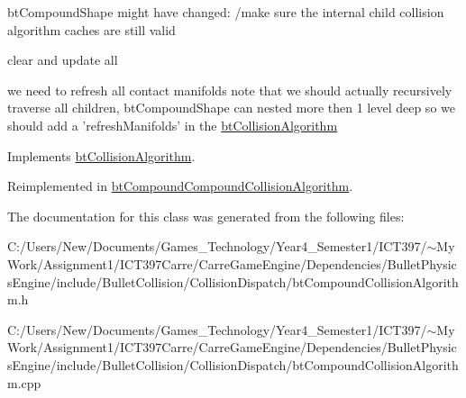 btCompoundShape might have changed: /make sure the internal child collision algorithm caches are still valid

clear and update all

we need to refresh all contact manifolds note that we should actually recursively traverse all children, btCompoundShape can nested more then 1 level deep so we should add a 'refreshManifolds' in the \hyperlink{classbt_collision_algorithm}{btCollisionAlgorithm} 

Implements \hyperlink{classbt_collision_algorithm}{btCollisionAlgorithm}.

Reimplemented in \hyperlink{classbt_compound_compound_collision_algorithm_5fb9d60f9713c0e3795c89390353beb3}{btCompoundCompoundCollisionAlgorithm}.

The documentation for this class was generated from the following files:\begin{CompactItemize}
\item 
C:/Users/New/Documents/Games\_\-Technology/Year4\_\-Semester1/ICT397/$\sim$My Work/Assignment1/ICT397Carre/CarreGameEngine/Dependencies/BulletPhysicsEngine/include/BulletCollision/CollisionDispatch/btCompoundCollisionAlgorithm.h\item 
C:/Users/New/Documents/Games\_\-Technology/Year4\_\-Semester1/ICT397/$\sim$My Work/Assignment1/ICT397Carre/CarreGameEngine/Dependencies/BulletPhysicsEngine/include/BulletCollision/CollisionDispatch/btCompoundCollisionAlgorithm.cpp\end{CompactItemize}

